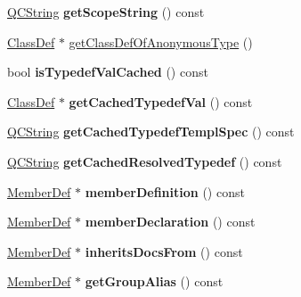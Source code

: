 \begin{DoxyCompactItemize}
\item 
\mbox{\label{class_member_def_a2193bd3780118ac6ad63e431495b2c69}} 
\mbox{\hyperlink{class_q_c_string}{Q\+C\+String}} {\bfseries get\+Scope\+String} () const
\item 
\mbox{\hyperlink{class_class_def}{Class\+Def}} $\ast$ \mbox{\hyperlink{class_member_def_a55dd478aba299892bdf1f4d22c21c95a}{get\+Class\+Def\+Of\+Anonymous\+Type}} ()
\item 
\mbox{\label{class_member_def_a7d23a58eb5b7e72bbe2db4687998d17a}} 
bool {\bfseries is\+Typedef\+Val\+Cached} () const
\item 
\mbox{\label{class_member_def_a37f9758622e4cdd8de813a996eef9e26}} 
\mbox{\hyperlink{class_class_def}{Class\+Def}} $\ast$ {\bfseries get\+Cached\+Typedef\+Val} () const
\item 
\mbox{\label{class_member_def_aa5f4fdc3670d65ebdc975af5eda58208}} 
\mbox{\hyperlink{class_q_c_string}{Q\+C\+String}} {\bfseries get\+Cached\+Typedef\+Templ\+Spec} () const
\item 
\mbox{\label{class_member_def_af1b414d9e0c4cfb8850d9748964c3f67}} 
\mbox{\hyperlink{class_q_c_string}{Q\+C\+String}} {\bfseries get\+Cached\+Resolved\+Typedef} () const
\item 
\mbox{\label{class_member_def_a4e9cbc73eb8c93aec52f9c71f9486f7b}} 
\mbox{\hyperlink{class_member_def}{Member\+Def}} $\ast$ {\bfseries member\+Definition} () const
\item 
\mbox{\label{class_member_def_a6fcdd56034ab952ffeb3ad8a66f8f8be}} 
\mbox{\hyperlink{class_member_def}{Member\+Def}} $\ast$ {\bfseries member\+Declaration} () const
\item 
\mbox{\label{class_member_def_a850997dcfc6a3240f942971e0759789f}} 
\mbox{\hyperlink{class_member_def}{Member\+Def}} $\ast$ {\bfseries inherits\+Docs\+From} () const
\item 
\mbox{\label{class_member_def_a8123a447243430c1302924f06ede243a}} 
\mbox{\hyperlink{class_member_def}{Member\+Def}} $\ast$ {\bfseries get\+Group\+Alias} () const

\end{DoxyCompactItemize}
